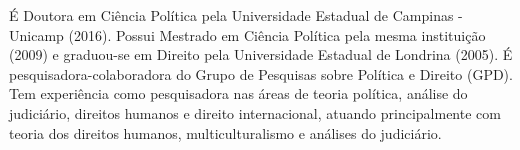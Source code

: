 
\begin{cvparagraph}

É Doutora em Ciência Política pela Universidade Estadual de Campinas - Unicamp (2016). Possui Mestrado em Ciência Política pela mesma instituição (2009) e graduou-se em Direito pela Universidade Estadual de Londrina (2005). É pesquisadora-colaboradora do Grupo de Pesquisas sobre Política e Direito (GPD). Tem experiência como pesquisadora nas áreas de teoria política, análise do judiciário, direitos humanos e direito internacional, atuando principalmente com teoria dos direitos humanos, multiculturalismo e análises do judiciário.

\end{cvparagraph}
